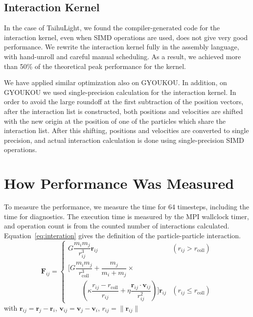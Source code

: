\documentclass[conference]{IEEEtran}
\begin{document}
\subsection{Interaction Kernel}

In the case of TaihuLight, we found the compiler-generated code for
the interaction kernel, even when SIMD operations are used, does not
give very good performance. We rewrite the interaction kernel fully in
the assembly language, with hand-unroll and careful manual scheduling. As
a result, we achieved more than 50\% of the theoretical peak
performance for the kernel.

We have applied similar optimization also
on GYOUKOU. In addition, on GYOUKOU we used single-precision
calculation for the interaction kernel. In order to avoid the large
roundoff at the first subtraction of the position vectors, after the
interaction list is constructed, both positions and velocities are
shifted with the new origin at the position of one of the particles which share the
interaction list. After this shifting, positions and velocities are
converted to single precision, and actual interaction calculation is
done using single-precision SIMD operations.


\section{How Performance Was Measured}


To measure the performance, we measure the time for 64 timesteps,
including the time for  diagnostics. 
The
execution time is measured by the MPI wallclock timer, and operation
count is from the counted number of interactions
calculated. Equation~\ref{eq:interation}  gives the definition of the
particle-particle interaction. 
{%
\begin{equation}
  \bm F_{ij} = \begin{cases} G \dfrac{m_i m_j}
    {r_{ij}^3} \bm r_{ij} & \left(r_{ij} > r_\text{coll} \right)
    \\
    \Biggl[  G \dfrac{m_i m_j} {r_\text{coll}^3}  + \dfrac{m_j}{m_i
        + m_j}  \times \\ \qquad  \left(      \kappa \dfrac{r_{ij} -
        r_\text{coll}}{r_{ij}}    + \eta \dfrac{\bm r_{ij} \cdot \bm
        v_{ij}}{r_{ij}^2}    \right) \Biggr] \bm r_{ij} & \left(
    r_{ij} \le r_\text{coll} \right) \end{cases}
  \label{eq:interation} 
\end{equation}
}
with
$\bm r_{ij} = \bm r_j - \bm r_i$, $\bm v_{ij} = \bm v_j - \bm v_i$,
$r_{ij} = \| \bm r_{ij} \|$
\end{document}

